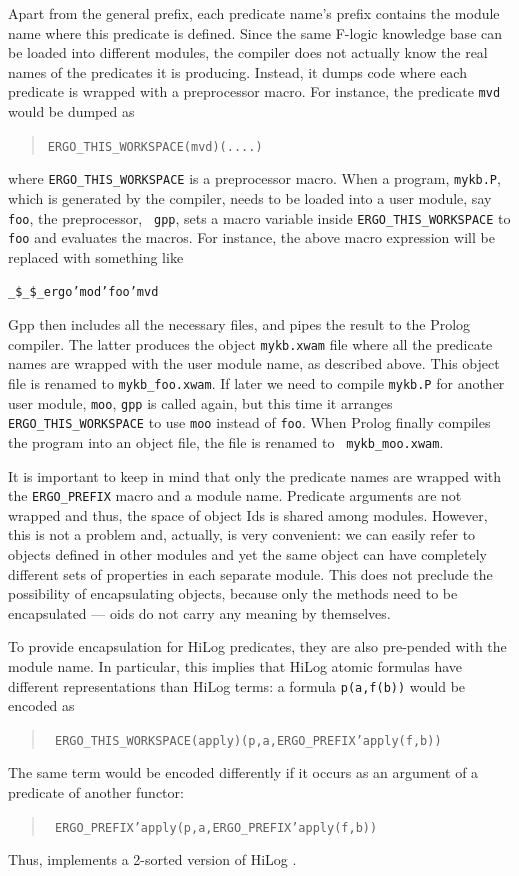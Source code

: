 \documentclass[11pt]{article}
\newcommand{\ERGO}{\mbox{\smaller{\ensuremath{\cal{E}}\smaller{{\sc{RGO}}}}}\xspace}
\newcommand{\FLSYSTEM}{\ERGO}
\newcommand{\fl}{\mbox{F-logic}\xspace}
\newcommand{\ofile}{xwam}
\begin{document}
Apart from the general prefix, each predicate name's prefix contains the module
name where this predicate is defined. Since the same \fl knowledge base
can be loaded into different modules, the \FLSYSTEM compiler does not actually
know the real names of the predicates it is producing. Instead, it dumps
code where each predicate is wrapped with a preprocessor macro. For
instance, the predicate {\tt mvd} would be dumped as
\begin{quote}
 \tt ERGO\_THIS\_WORKSPACE(mvd)(....)  
\end{quote}
where {\tt ERGO\_THIS\_WORKSPACE} is a preprocessor macro. 
When a program, {\tt mykb.P}, which is generated by the \FLSYSTEM compiler,
needs to be loaded into a user module, say {\tt foo}, the preprocessor, {\tt
  gpp}, sets a macro variable inside {\tt ERGO\_THIS\_WORKSPACE} to {\tt
  foo} and evaluates the macros.
For instance, the above macro expression will be replaced with something like
\begin{alltt}
 \_\$\_\$\_ergo'mod'foo'mvd  
\end{alltt}
Gpp then includes all the
necessary files, and pipes the result to the Prolog compiler. The latter
produces the object {\tt mykb.\ofile} file where all the predicate names are
wrapped with the user module name, as described above.  This object file is
renamed to {\tt mykb\_foo.\ofile}. If later we need to compile {\tt mykb.P}
for another user module, {\tt moo}, {\tt gpp} is called again, but this time it
arranges {\tt ERGO\_THIS\_WORKSPACE} to use \texttt{moo} instead of
{\tt foo}. When Prolog finally compiles
the program into an object file, the file is renamed to {\tt
  mykb\_moo.\ofile}.

It is important to keep in mind that only the predicate names are wrapped
with the {\tt ERGO\_PREFIX} macro and a module name. Predicate arguments
are not wrapped and thus, the space of object Ids is shared among modules.
However, this is not a problem and, actually, is very convenient: we can
easily refer to objects defined in other modules and yet the same object
can have completely different sets of properties in each separate module.
This does not preclude the possibility of encapsulating objects, because
only the methods need to be encapsulated --- oids do not carry any meaning
by themselves.

To provide encapsulation for HiLog predicates, they are also pre-pended with
the module name. In particular, this implies that HiLog atomic formulas
have different representations than HiLog terms: a formula {\tt p(a,f(b))}
would be encoded as
\begin{quote}
 \tt
 ERGO\_THIS\_WORKSPACE(apply)(p,a,ERGO\_PREFIX'apply(f,b))  
\end{quote}
The same term would be encoded differently if it occurs as an argument of a
predicate of another functor:
\begin{quote}
 \tt
 ERGO\_PREFIX'apply(p,a,ERGO\_PREFIX'apply(f,b))    
\end{quote}
Thus, \FLSYSTEM implements a 2-sorted version of HiLog \cite{hilog-icdt-95}.
\end{document}
